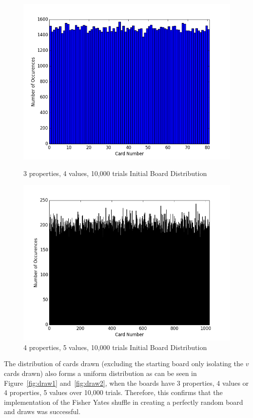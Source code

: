 \documentclass[pageno]{jpaper}
\begin{document}
\begin{figure}[htbb]
\begin{minipage}[b]{0.5\linewidth}
\centering
\includegraphics[width=.75\linewidth]{3p4v10000Init.png}
\caption{3 properties, 4 values, 10,000 trials Initial Board Distribution}
\label{fig:init1}
\end{minipage}
\hspace{0.5cm}
\begin{minipage}[b]{0.5\linewidth}
\centering
\includegraphics[width=.75\linewidth]{4p5v10000Init.png}
\caption{4 properties, 5 values, 10,000 trials Initial Board Distribution}
\label{fig:init2}
\end{minipage}
\end{figure}


The distribution of cards drawn (excluding the starting board only isolating the $v$ cards drawn) also forms a uniform distribution as can be seen in Figure~\ref{fig:draw1}  and~\ref{fig:draw2}, when the boards have 3 properties, 4 values or 4 properties, 5 values over 10,000 trials. Therefore, this confirms that the implementation of the Fisher Yates shuffle in creating a perfectly random board and draws was successful. 
\end{document}

